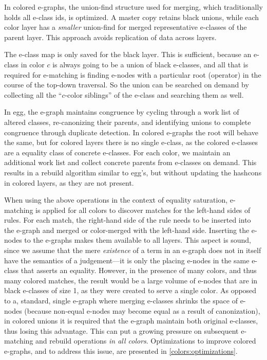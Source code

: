 In colored e-graphs, the union-find structure used for merging, which traditionally holds all e-class ids, is optimized. 
A master copy retains black unions, while each color layer has a \emph{smaller} union-find for merged representative e-classes of the parent layer. 
This approach avoids replication of data across layers.

The e-class map is only saved for the black layer.
This is sufficient, because an e-class in color $c$ is always going to be a union of black e-classes, and all that is required for e-matching is finding e-nodes with a particular root (operator) in the course of the top-down traversal.
So the union can be searched on demand by collecting all the ``$c$-color siblings'' of the e-class and searching them as well.

In egg, the e-graph maintains congruence by cycling through a work list of altered classes, re-canonizing their parents, and identifying unions to complete congruence through duplicate detection.
In colored e-graphs the root will behave the same, but for colored layers there is no single e-class, as the colored e-classes are a equality class of concrete e-classes.
For each color, we maintain an additional work list and collect concrete parents from e-classes on demand. 
This results in a rebuild algorithm similar to egg's, but without updating the hashcons in colored layers, as they are not present.

When using the above operations in the context of equality saturation, e-matching is applied for all colors
to discover matches for the left-hand sides of rules.
For each match, the right-hand side of the rule needs to be inserted into the e-graph and merged or color-merged with the left-hand side.
Inserting the e-nodes to the e-graphs makes them available to all layers.
This aspect is sound, since
we assume that the mere \emph{existence} of a term in an e-graph does not in itself have the semantics of a judgement---it is only the placing e-nodes in the same e-class that asserts an equality.
However, in the presence of many colors, and thus many colored matches, the result would be a large volume of e-nodes that are in black e-classes of size 1, as they
were created to serve a single color.
As opposed to a, standard, single e-graph where merging e-classes shrinks the space of e-nodes (because non-equal e-nodes may become equal as a result of canonization),
in colored unions it is required that the e-graph maintain both original e-classes, thus losing this advantage.
This can put a growing pressure on subsequent e-matching and rebuild operations \emph{in all colors}.
Optimizations to improve colored e-graphs, and to address this issue, are presented in \autoref{colors:optimizations}.

